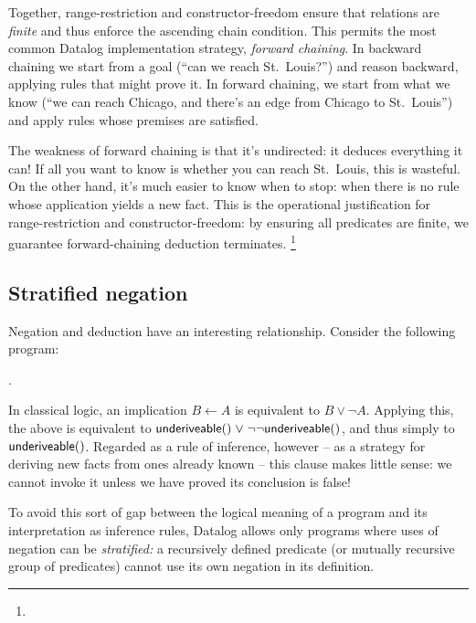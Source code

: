 \noindent
Together, range-restriction and constructor-freedom ensure that relations are
\emph{finite} and thus enforce the ascending chain condition.
%
This permits the most common Datalog implementation strategy, \emph{forward
  chaining}.
%
In backward chaining we start from a goal (``can we reach St.~Louis?'') and
reason backward, applying rules that might prove it.
%
In forward chaining, we start from what we know (``we can reach Chicago, and
there's an edge from Chicago to St.~Louis'') and apply rules whose premises are
satisfied.

The weakness of forward chaining is that it's undirected: it deduces everything
it can! If all you want to know is whether you can reach St.~Louis, this is
wasteful. On the other hand, it's much easier to know when to stop: when there
is no rule whose application yields a new fact. This is the operational
justification for range-restriction and constructor-freedom: by ensuring all
predicates are finite, we guarantee forward-chaining deduction terminates.%
%
\footnote{}



\subsection{Stratified negation}
\label{section-stratified-negation}

Negation and deduction have an interesting relationship.
%
Consider the following program:

\nopagebreak[1]
\begin{datalog}
   \gets \neg {}.
\end{datalog}

\noindent
In classical logic, an implication $B \gets A$ is equivalent to $B \vee \neg A$.
Applying this, the above is equivalent to $\atom{underiveable}{} \vee
\neg\neg\atom{underiveable}{}$, and thus simply to $\text{\sffamily underiveable}({})$.
%
Regarded as a rule of inference, however -- as a strategy for deriving new facts
from ones already known -- this clause makes little sense: we cannot invoke it
unless we have proved its conclusion is false!

To avoid this sort of gap between the logical meaning of a program and its
interpretation as inference rules, Datalog allows only programs where uses of
negation can be \emph{stratified:} a recursively defined predicate (or mutually
recursive group of predicates) cannot use its own negation in its definition.

